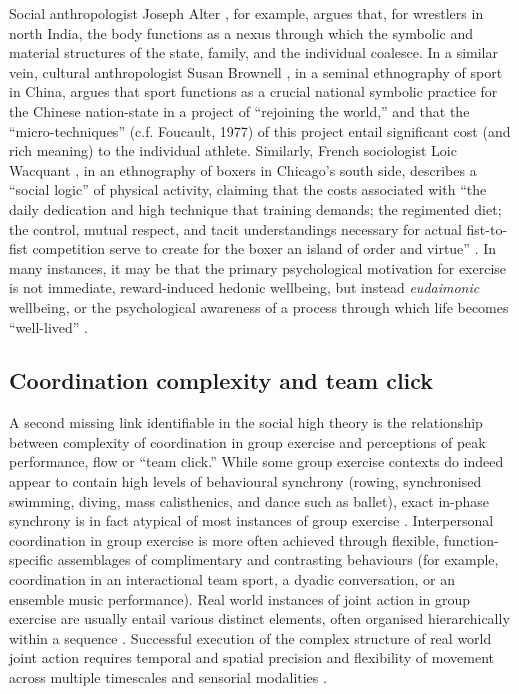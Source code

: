 \begin{CJK}{UTF8}{gbsn}
Social anthropologist Joseph Alter \textcite{Alter1993}, for example, argues that, for wrestlers in north India, the body functions as a nexus through which the symbolic and material structures of the state, family, and the individual coalesce.  In a similar vein, cultural anthropologist Susan Brownell \textcite{Brownwell1995}, in a seminal ethnography of sport in China, argues that sport functions as a crucial national symbolic practice for the Chinese nation-state in a project of ``rejoining the world,'' and that the ``micro-techniques'' (c.f. Foucault, 1977) of this project entail significant cost (and rich meaning) to the individual athlete.   Similarly, French sociologist Loic Wacquant \textcite{Wacquant2004}, in an ethnography of boxers in Chicago's south side, describes a ``social logic'' of physical activity, claiming that the costs associated with ``the daily dedication and high technique that training demands; the regimented diet; the control, mutual respect, and tacit understandings necessary for actual fist-to-fist competition serve to create for the boxer an island of order and virtue'' \textcite[17]{Wacquant2004}. In many instances, it may be that the primary psychological motivation for exercise is not immediate, reward-induced hedonic wellbeing, but instead \textit{eudaimonic} wellbeing, or the psychological awareness of a process through which life becomes ``well-lived'' \citep{Fave2009,Huta2013}.

\subsection{Coordination complexity and team click\label{sect:linksComplexClick}}
A second missing link identifiable in the social high theory is the relationship between complexity of coordination in group exercise and perceptions of peak performance, flow or ``team click.''  While some group exercise contexts do indeed appear to contain high levels of behavioural synchrony (rowing, synchronised swimming, diving, mass calisthenics, and dance such as ballet), exact in-phase synchrony is in fact atypical of most instances of group exercise \citep{Fusaroli2014}.  Interpersonal coordination in group exercise is more often achieved through flexible, function-specific assemblages of complimentary and contrasting behaviours (for example, coordination in an interactional team sport, a dyadic conversation, or an ensemble music performance).  Real world instances of joint action in group exercise are usually entail various distinct elements, often organised hierarchically within a sequence \citep{Schmidt1975,Rosenbaum2009}.  Successful execution of the complex structure of real world joint action requires temporal and spatial precision and flexibility of movement across multiple timescales and sensorial modalities \citep{Sebanz2006}.


\end{CJK}
